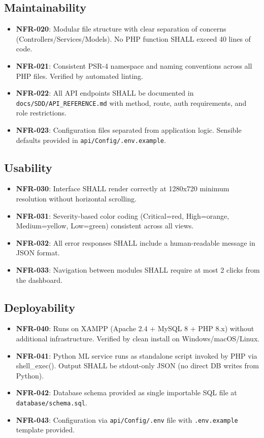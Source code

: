 \documentclass[12pt,a4paper]{report}
\begin{document}
	\subsection{Maintainability}
	\begin{itemize}
		\item \textbf{NFR-020}: Modular file structure with clear separation of concerns (Controllers/Services/Models). No PHP function SHALL exceed 40 lines of code.
		\item \textbf{NFR-021}: Consistent PSR-4 namespace and naming conventions across all PHP files. Verified by automated linting.
		\item \textbf{NFR-022}: All API endpoints SHALL be documented in \texttt{docs/SDD/API\_REFERENCE.md} with method, route, auth requirements, and role restrictions.
		\item \textbf{NFR-023}: Configuration files separated from application logic. Sensible defaults provided in \texttt{api/Config/.env.example}.
	\end{itemize}
	
	\subsection{Usability}
	\begin{itemize}
		\item \textbf{NFR-030}: Interface SHALL render correctly at 1280x720 minimum resolution without horizontal scrolling.
		\item \textbf{NFR-031}: Severity-based color coding (Critical=red, High=orange, Medium=yellow, Low=green) consistent across all views.
		\item \textbf{NFR-032}: All error responses SHALL include a human-readable message in JSON format.
		\item \textbf{NFR-033}: Navigation between modules SHALL require at most 2 clicks from the dashboard.
	\end{itemize}
	
	\subsection{Deployability}
	\begin{itemize}
		\item \textbf{NFR-040}: Runs on XAMPP (Apache 2.4 + MySQL 8 + PHP 8.x) without additional infrastructure. Verified by clean install on Windows/macOS/Linux.
		\item \textbf{NFR-041}: Python ML service runs as standalone script invoked by PHP via shell\_exec(). Output SHALL be stdout-only JSON (no direct DB writes from Python).
		\item \textbf{NFR-042}: Database schema provided as single importable SQL file at \texttt{database/schema.sql}. 
		\item \textbf{NFR-043}: Configuration via \texttt{api/Config/.env} file with \texttt{.env.example} template provided.
	\end{itemize}
	
\end{document}
